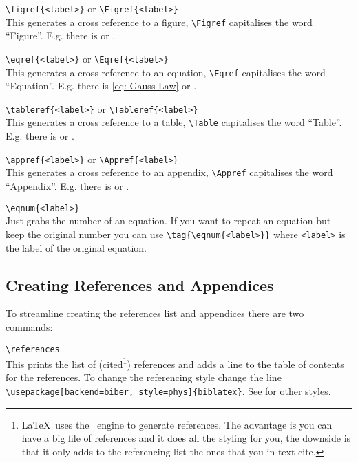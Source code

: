 \documentclass[Book Template.tex]{subfiles}
\begin{document}
                \verb+\figref{<label>}+ or \verb+\Figref{<label>}+\\
                This generates a cross reference to a figure, \verb+\Figref+ capitalises the word ``Figure''. E.g. there is  or .

                \verb+\eqref{<label>}+ or \verb+\Eqref{<label>}+\\
                This generates a cross reference to an equation, \verb+\Eqref+ capitalises the word ``Equation''. E.g. there is \eqref{eq: Gauss Law} or .

                \verb+\tableref{<label>}+ or \verb+\Tableref{<label>}+\\
                This generates a cross reference to a table, \verb+\Table+ capitalises the word ``Table''. E.g. there is  or .

                \verb+\appref{<label>}+ or \verb+\Appref{<label>}+\\
                This generates a cross reference to an appendix, \verb+\Appref+ capitalises the word ``Appendix''. E.g. there is  or .

                \verb+\eqnum{<label>}+\\
                Just grabs the number of an equation. If you want to repeat an equation but keep the original number you can use \verb+\tag{\eqnum{<label>}}+ where \verb+<label>+ is the label of the original equation.

            \newpage

            \subsection{Creating References and Appendices}
                \label{subsec: creating references and appendices}

                To streamline creating the references list and appendices there are two commands:

                \verb+\references+\\
                This prints the list of (cited\footnote{\LaTeX~uses the \BibTeX~engine to generate references. The advantage is you can have a big file of references and it does all the styling for you, the downside is that it only adds to the referencing list the ones that you in-text cite.}) references and adds a line to the table of contents for the references. To change the referencing style change the line \\\verb+\usepackage[backend=biber, style=phys]{biblatex}+. See \textcite{referencing-styles} for other styles.
\end{document}
